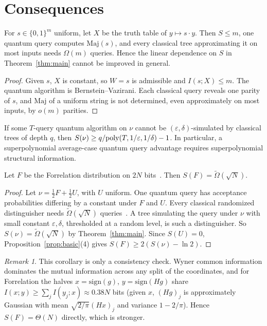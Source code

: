 \documentclass[11pt]{article}
\theoremstyle{definition}\newtheorem{definition}[theorem]{Definition}\newtheorem{problem}{Open Problem}
\theoremstyle{remark}\newtheorem{remark}[theorem]{Remark}
\begin{document}
\section{Consequences}
\begin{proposition}
For $s\in\{0,1\}^m$ uniform, let $X$ be the truth table of $y\mapsto s\cdot y$. Then $S\le m$, one quantum query computes $\mathrm{Maj}(s)$, and every classical tree approximating it on most inputs needs $\Omega(m)$ queries. Hence the linear dependence on $S$ in Theorem~\ref{thm:main} cannot be improved in general.
\end{proposition}
\begin{proof}
Given $s$, $X$ is constant, so $W=s$ is admissible and $I(s;X)\le m$. The quantum algorithm is Bernstein--Vazirani. Each classical query reveals one parity of $s$, and $\mathrm{Maj}$ of a uniform string is not determined, even approximately on most inputs, by $o(m)$ parities.
\end{proof}

\begin{corollary}
If some $T$-query quantum algorithm on $\nu$ cannot be $(\varepsilon,\delta)$-simulated by classical trees of depth $q$, then $S(\nu)\ge q/\mathrm{poly}(T,1/\varepsilon,1/\delta)-1$. In particular, a superpolynomial average-case quantum query advantage requires superpolynomial structural information.
\end{corollary}

\begin{corollary}[Forrelation]
Let $F$ be the Forrelation distribution on $2N$ bits~\cite{AA15}. Then $S(F)=\tilde\Omega(\sqrt N)$.
\end{corollary}
\begin{proof}
Let $\nu=\tfrac12F+\tfrac12U$, with $U$ uniform. One quantum query has acceptance probabilities differing by a constant under $F$ and $U$. Every classical randomized distinguisher needs $\tilde\Omega(\sqrt N)$ queries~\cite{AA15}. A tree simulating the query under $\nu$ with small constant $\varepsilon,\delta$, thresholded at a random level, is such a distinguisher. So $S(\nu)=\tilde\Omega(\sqrt N)$ by Theorem~\ref{thm:main}. Since $S(U)=0$, Proposition~\ref{prop:basic}(4) gives $S(F)\ge 2(S(\nu)-\ln 2)$.
\end{proof}
\begin{remark}This corollary is only a consistency check. Wyner common information dominates the mutual information across any split of the coordinates, and for Forrelation the halves $x=\mathrm{sign}(g)$, $y=\mathrm{sign}(Hg)$ share $I(x;y)\ge\sum_j I(y_j;x)\approx 0.38N$ bits (given $x$, $(Hg)_j$ is approximately Gaussian with mean $\sqrt{2/\pi}(Hx)_j$ and variance $1-2/\pi$). Hence $S(F)=\Theta(N)$ directly, which is stronger.\end{remark}
\end{document}
